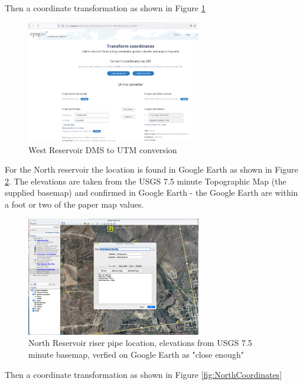 \documentclass[12pt]{article}
\begin{document}
\begin{enumerate}
Then a coordinate transformation as shown in Figure \ref{fig:WestCoordinates}

\begin{figure}[h!] %
   \centering
   \includegraphics[width=3in]{WestCoordinates.png} 
   \caption{West Reservoir DMS to UTM conversion}
   \label{fig:WestCoordinates}
\end{figure}

\clearpage

For the North reservoir the location is found in Google Earth as shown in Figure \ref{fig:NorthBasin}.  The elevations are taken from the USGS 7.5 minute Topographic Map (the supplied basemap) and confirmed in Google Earth - the Google Earth are within a foot or two of the paper map values.

\begin{figure}[h!] %
   \centering
   \includegraphics[width=3in]{NorthReservoir.png} 
   \caption{North Reservoir riser pipe location, elevations from USGS 7.5 minute basemap, verfied on Google Earth as "close enough"}
   \label{fig:NorthBasin}
\end{figure}

Then a coordinate transformation as shown in Figure \ref{fig:NorthCoordinates}


\end{enumerate}
\end{document}
